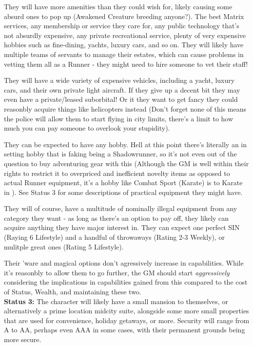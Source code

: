 \begin{multicols}{2}
\begin{coloredbox}
	They will have more amenities than they could wish for, likely causing some absurd ones to pop up (Awakened Creature breeding anyone?). The best Matrix services, any membership or service they care for, any public technology that's not absurdly expensive, any private recreational service, plenty of very expensive hobbies such as fine-dining, yachts, luxury cars, and so on. They will likely have multiple teams of servants to manage their estates, which can cause problems in vetting them all as a Runner - they might need to hire someone to vet their staff! 
	
	They will have a wide variety of expensive vehicles, including a yacht, luxury cars, and their own private light aircraft. If they give up a decent bit they may even have a private/leased suborbital! Or it they want to get fancy they could reasonbly acquire things like helicopters instead (Don't forget none of this means the police will allow them to start flying in city limits, there's a limit to how much you can pay someone to overlook your stupidity).
	
	They can be expected to have any hobby. Hell at this point there's literally an in setting hobby that is faking being a Shadowrunner, so it's not even out of the question to buy adventuring gear with this (Although the GM is well within their rights to restrict it to overpriced and inefficient novelty items as opposed to actual Runner equipment, it's a hobby like Combat Sport (Karate) is to Karate in \GURPS). See Status 3 for some descriptions of practical equipment they might have. 
	
	They will of course, have a multitude of nominally illegal equipment from any category they want - as long as there's an option to pay off, they likely can acquire anything they have major interest in. They can expect one perfect SIN (Raying 6 Lifestyle) and a handful of throwaways (Rating 2-3 Weekly), or mulitple great ones (Rating 5 Lifestyle).
	
	Their 'ware and magical options don't agressively increase in capabilities. While it's reasonbly to allow them to go further, the GM should start \textit{aggressively} considering the implications in capabilities gained from this compared to the cost of Status, Wealth, and maintaining these two.\\
	
	\textbf{Status 3:} The character will likely have a small mansion to themselves, or alternatively a prime location midcity suite, alongside some more small properties that are used for convenience, holiday getaways, or more. Security will range from A to AA, perhaps even AAA in some cases, with their permanent grounds being more secure.
	

\end{coloredbox}
\end{multicols}
